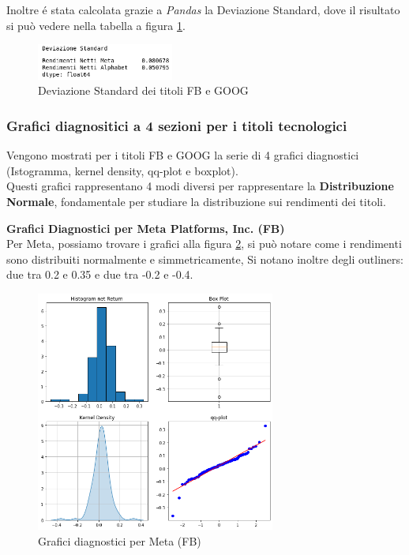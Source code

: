 \documentclass{article}
\begin{document}
Inoltre é stata calcolata grazie a \emph{Pandas} la Deviazione Standard, dove il risultato si può vedere nella tabella a figura \ref{fig:ds_tecno}.

\begin{figure}[h]
  \centering
  \includegraphics[width=0.4\textwidth]{ds_tecno.png}
  \caption{Deviazione Standard dei titoli FB e GOOG}
  \label{fig:ds_tecno}
\end{figure}

\pagebreak

\subsubsection{Grafici diagnositici a 4 sezioni per i titoli tecnologici}

Vengono mostrati per i titoli FB e GOOG la serie di 4 grafici diagnostici (Istogramma, kernel density, qq-plot e boxplot).\\
Questi grafici rappresentano 4 modi diversi per rappresentare la \textbf{Distribuzione Normale}, fondamentale per studiare la distribuzione sui rendimenti dei titoli.

\textbf{Grafici Diagnostici per Meta Platforms, Inc. (FB)}\\
Per Meta, possiamo trovare i grafici alla figura \ref{fig:meta_diagn}, si può notare come i rendimenti sono distribuiti normalmente e simmetricamente,
Si notano inoltre degli outliners: due tra 0.2 e 0.35 e due tra -0.2 e -0.4.

\begin{figure}[h]
  \centering
  \includegraphics[width=0.7\textwidth]{meta_diagn.png}
  \caption{Grafici diagnostici per Meta (FB)}
  \label{fig:meta_diagn}
\end{figure}
\end{document}
